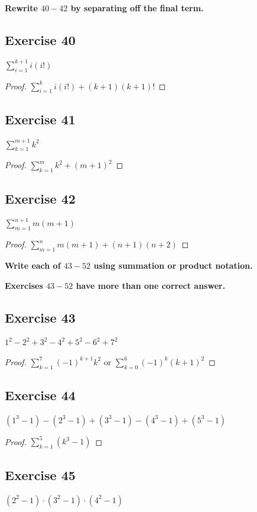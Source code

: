 \documentclass[14pt]{extarticle}
\newcommand{\dps}{\displaystyle}
\newcommand{\cy}{\color{cyan}}
\begin{document}
{\bf\cy Rewrite $40-42$ by separating off the final term.}

\subsection{Exercise 40}
$\dps\sum_{i=1}^{k+1}i(i!)$

\begin{proof}
$\dps\sum_{i=1}^{k}i(i!) + (k+1)(k+1)!$
\end{proof}

\subsection{Exercise 41}
$\dps\sum_{k=1}^{m+1}k^2$

\begin{proof}
$\dps\sum_{k=1}^{m}k^2 + (m+1)^2$
\end{proof}

\subsection{Exercise 42}
$\dps\sum_{m=1}^{n+1}m(m+1)$

\begin{proof}
$\dps\sum_{m=1}^{n}m(m+1) + (n+1)(n+2)$
\end{proof}

{\bf\cy Write each of $43-52$ using summation or product
notation.}

{\bf\cy Exercises $43-52$ have more than one correct answer.}

\subsection{Exercise 43}
$1^2 - 2^2 + 3^2 - 4^2 + 5^2 - 6^2 + 7^2$

\begin{proof}
$\dps \sum_{k=1}^{7}(-1)^{k+1}k^2$ or $\dps \sum_{k=0}^{6}(-1)^{k}(k+1)^2$
\end{proof}

\subsection{Exercise 44}
$(1^3 - 1) - (2^3 - 1) + (3^3 - 1) - (4^3 - 1) + (5^3 - 1)$

\begin{proof}
$\dps\sum_{k=1}^{5}(k^3-1)$
\end{proof}

\subsection{Exercise 45}
$(2^2 - 1)\cdot(3^2 - 1)\cdot(4^2 - 1)$
\end{document}
